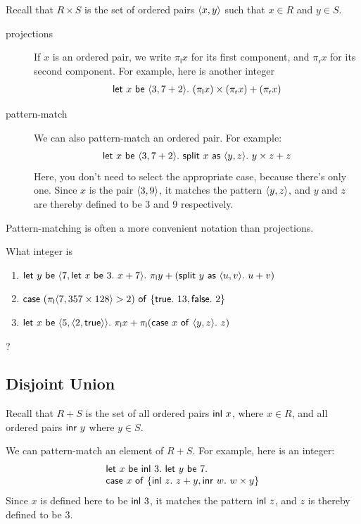 \documentclass[runningheads,12pt]{llncs}
\newcommand{\itletmac}[2]{\mathsf{let}\ {#2}\ \mathsf{be}\ {#1}.\ }
\newcommand{\itsplit}{\mathsf{split}\ }
\newcommand{\itspof}{\ \mathsf{as}\ }
\newcommand{\projl}{\pi_{\mathsf{l}}}
\newcommand{\projr}{\pi_{\mathsf{r}}}
\begin{document}
Recall that $R \times S$ is the set of ordered pairs $\langle {{x},{y}} \rangle$ such that $x \in R$ and $y \in S$.  

\begin{description}
\item[projections] If $x$ is an ordered pair, we write $\projl x$ for its first component, and $\projr x$ for its second component.  For example, here is another integer
  \begin{displaymath}
    \itletmac{ \pair{3}{7+2} }{ x } (\projl x) \times (\projr x) + (\projr x) 
  \end{displaymath}
\item[pattern-match] We can also pattern-match an ordered pair.  For example:
  \begin{displaymath}
    \itletmac{ \pair{3}{7+2} }{ x } \itsplit x \itspof \pair{y}{z} \itin y \times z + z
  \end{displaymath}
Here, you don't need to select the appropriate case, because there's only one.  Since $x$ is the pair $\langle {{3},{9}} \rangle$, it matches the pattern $\langle {{y},{z}} \rangle$, and $y$ and $z$ are thereby defined to be 3 and 9 respectively.
\end{description}
Pattern-matching is often a more convenient notation than projections.

\begin{exercise}
What integer is
  \begin{enumerate}
  \item $\itletmac{ \pair{7}{\itletmac{ 3 }{ x } x+7} }{ y } \projl y + (\itsplit y \itspof \pair{u}{v} \itin u+v)$
  \item $\itcase (\projl \pair{7}{357 \times 128}>2) \itof \{ \ittrue.\ 13, \itfalse.\ 2 \}$ 
  \item $\itletmac{ \pair{5}{\pair{2}{\ittrue}} }{ x } \projl x + \projl (\itcase x \itof \pair{y}{z} \itin z)$
  \end{enumerate}
?
\end{exercise}

\subsection{Disjoint Union}

Recall that $R + S$ is the set of all ordered pairs $\mathsf{inl} \  {x}$, where $x \in R$, and all ordered pairs $\mathsf{inr} \  {y}$ where $y \in S$.  

We can pattern-match an element of $R + S$.  For example, here is an integer:
\begin{displaymath}
  \begin{array}{l}
  \itletmac{ \ittagl{3} }{ x } \itletmac{ 7 }{ y } \\
  \itcase x \itof \{ \ittagl{z}.\ z+y, \ittagr{w}.\ w \times y \}
\end{array}
\end{displaymath}
Since $x$ is defined here to be $\mathsf{inl} \  {3}$, it matches the pattern $\mathsf{inl} \  {z}$, and $z$ is thereby defined to be 3.
\end{document}
